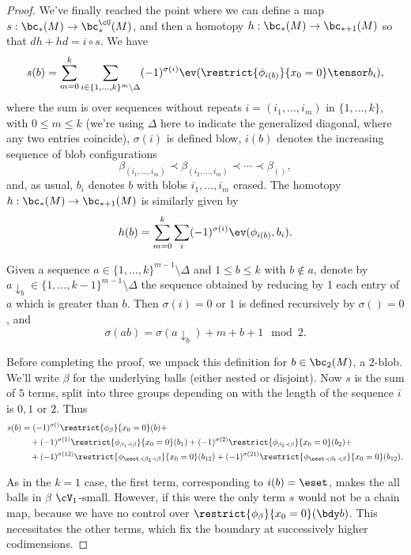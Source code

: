 \begin{proof}

\newcommand{\length}[1]{\operatorname{length}(#1)}

We've finally reached the point where we can define a map $s: \bc_*(M) \to \bc^{\cU}_*(M)$, and then a homotopy $h:\bc_*(M) \to \bc_{*+1}(M)$ so that $dh+hd=i\circ s$.  We have
$$s(b) = \sum_{m=0}^{k} \sum_{i \in \{1, \ldots, k\}^{m} \setminus \Delta} (-1)^{\sigma(i)}  \ev(\restrict{\phi_{i(b)}}{x_0 = 0} \tensor b_i),$$
where the sum is over sequences without repeats $i=(i_1,\ldots,i_m)$ in $\{1,\ldots,k\}$, with $0\leq m \leq k$ (we're using $\Delta$ here to indicate the generalized diagonal, where any two entries coincide), $\sigma(i)$ is defined blow, $i(b)$ denotes the increasing sequence of blob configurations
$$\beta_{(i_1,\ldots,i_m)} \prec \beta_{(i_2,\ldots,i_m)} \prec \cdots \prec \beta_{()},$$
and, as usual, $b_i$ denotes $b$ with blobs $i_1, \ldots, i_m$ erased.
The homotopy $h:\bc_*(M) \to \bc_{*+1}(M)$ is similarly given by
$$h(b) = \sum_{m=0}^{k} \sum_{i} (-1)^{\sigma(i)} \ev(\phi_{i(b)}, b_i).$$

Given a sequence $a \in \{1, \ldots, k\}^{m-1} \setminus \Delta$ and $1 \leq b \leq k$ with $b \not \in a$, denote by $a \!\downarrow_b\in \{1, \ldots, k-1\}^{m-1} \setminus \Delta$ the sequence obtained by reducing by 1 each entry of $a$ which is greater than $b$. Then $\sigma(i) = 0$ or $1$ is defined recursively by $\sigma() = 0$, and 
$$\sigma(ab) = \sigma(a \!\downarrow_b) + m + b + 1 \mod{2}.$$

Before completing the proof, we unpack this definition for $b \in \bc_2(M)$, a $2$-blob. We'll write $\beta$ for the underlying balls (either nested or disjoint).
Now $s$ is the sum of $5$ terms, split into three groups depending on with the length of the sequence $i$ is $0, 1$ or $2$. Thus
\begin{align*}
s(b) & = (-1)^{\sigma()} \restrict{\phi_{\beta}}{x_0 = 0}(b) + \\
	& \quad + (-1)^{\sigma(1)}  \restrict{\phi_{\beta_1 \prec \beta}}{x_0 = 0}(b_1) + (-1)^{\sigma(2)} \restrict{\phi_{\beta_2 \prec \beta}}{x_0 = 0}(b_2) + \\
	& \quad + (-1)^{\sigma(12)}  \restrict{\phi_{\eset \prec \beta_2 \prec \beta}}{x_0 = 0}(b_{12}) + (-1)^{\sigma(21)}  \restrict{\phi_{\eset \prec \beta_1 \prec \beta}}{x_0 = 0}(b_{12}).
\end{align*}

As in the $k=1$ case, the first term, corresponding to $i(b) = \eset$, makes the all balls in $\beta$ $\cV_1$-small. However, if this were the only term $s$ would not be a chain map, because we have no control over $\restrict{\phi_{\beta}}{x_0 = 0}(\bdy b)$. This necessitates the other terms, which fix the boundary at successively higher codimensions.


\end{proof}
